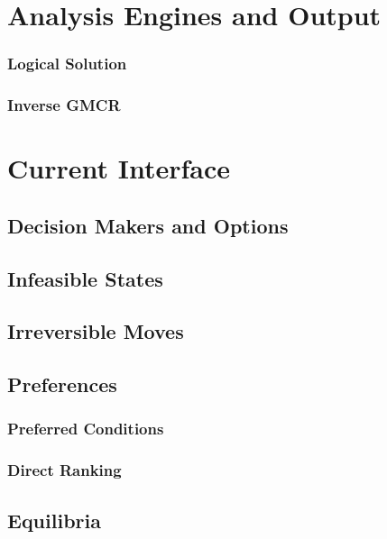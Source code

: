\documentclass[letterpaper,12pt,titlepage,oneside,final]{book}
\begin{document}
\section{Analysis Engines and Output}
\subsubsection{Logical Solution}

\subsubsection{Inverse GMCR}





\section{Current Interface}

\subsection{Decision Makers and Options}

\subsection{Infeasible States}

\subsection{Irreversible Moves}


\subsection{Preferences}


\subsubsection{Preferred Conditions}

\subsubsection{Direct Ranking}


\subsection{Equilibria}
\end{document}
